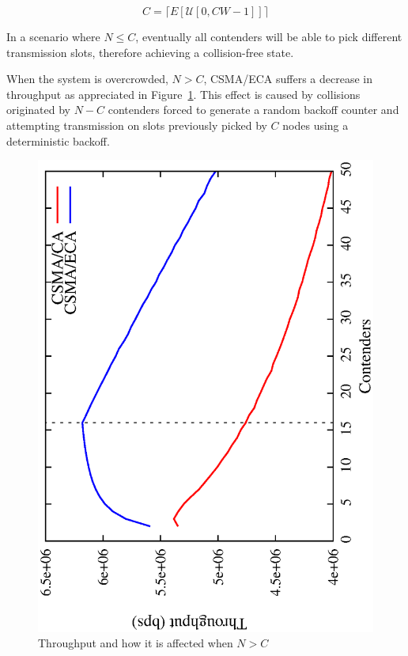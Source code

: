 
\begin{equation} \label{eq:capacity}	
	C = \lceil{E[\mathcal{U}[0, CW - 1]]}\rceil
\end{equation}

In a scenario where $N \leq C$, eventually all contenders will be able to pick different transmission slots, therefore achieving a collision-free state.

When the system is overcrowded, $N>C$, CSMA/ECA suffers a decrease in throughput as appreciated in Figure~\ref{fig:throughput}. This effect is caused by collisions originated by $N-C$ contenders forced to generate a random backoff counter and attempting transmission on slots previously picked by $C$ nodes using a deterministic backoff.


\begin{figure}[htbp]
  \centering
  \includegraphics[width=0.7\linewidth, angle = -90]{figures/throughput/throughput.eps}
  \caption{Throughput and how it is affected when $N>C$
  \label{fig:throughput}}
\end{figure}

